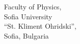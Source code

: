 \makeatletter
    \begin{titlepage}
        \begin{center}

            \vspace*{1cm}

            {\Huge\textbf{\@title}}

            \vspace{2cm}

            {\huge\textbf{\@author}}

            \vspace{0.8cm}

            {
                \Large
                Faculty of Physics,         \\
                Sofia University            \\
                ``St. Kliment Ohridski'',   \\
                Sofia, Bulgaria
            }

            \vspace{0.8cm}

            {\Large\@date}

        \end{center}
    \end{titlepage}